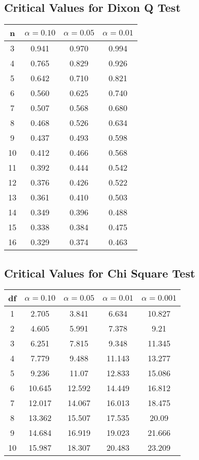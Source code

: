 \documentclass[a4paper,12pt]{article}
\begin{document}
\subsection*{Critical Values for Dixon Q Test}
{
	\Large
	\begin{center}
		\begin{tabular}{|c|c|c|c|}
			\hline  n  & $\alpha=0.10$  & $\alpha=0.05$  & $\alpha=0.01$  \\ \hline
			3  & 0.941 & 0.970  & 0.994 \\ \hline
			4  & 0.765 & 0.829 & 0.926 \\ \hline
			5  & 0.642 & 0.710  & 0.821 \\ \hline
			6  & 0.560  & 0.625 & 0.740  \\ \hline
			7  & 0.507 & 0.568 & 0.680  \\ \hline
			8  & 0.468 & 0.526 & 0.634 \\ \hline
			9  & 0.437 & 0.493 & 0.598 \\ \hline
			10 & 0.412 & 0.466 & 0.568 \\ \hline
			11 & 0.392 & 0.444 & 0.542 \\ \hline
			12 & 0.376 & 0.426 & 0.522 \\ \hline
			13 & 0.361 & 0.410  & 0.503 \\ \hline
			14 & 0.349 & 0.396 & 0.488 \\ \hline
			15 & 0.338 & 0.384 & 0.475 \\ \hline
			16 & 0.329 & 0.374 & 0.463 \\ \hline
		\end{tabular} 
	\end{center}
}
\subsection*{Critical Values for Chi Square Test}
{
	\Large
	\begin{center}
		\begin{tabular}{|c|c|c|c|c|}
			\hline 
			df	&	$\alpha=0.10$	&	$\alpha=0.05$	&	$\alpha=0.01$	&	$\alpha=0.001$	\\ \hline
			1	& 	2.705	&	3.841	&	6.634	&	10.827	\\ \hline
			2	&	4.605	&	5.991	&	7.378	&	9.21	\\ \hline
			3	&	6.251	&	7.815	&	9.348	&	11.345	\\ \hline
			4	&	7.779	&	9.488	&	11.143	&	13.277	\\ \hline
			5	&	9.236	&	11.07	&	12.833	&	15.086	\\ \hline
			6	&	10.645	&	12.592	&	14.449	&	16.812	\\ \hline
			7	&	12.017	&	14.067	&	16.013	&	18.475	\\ \hline
			8	&	13.362	&	15.507	&	17.535	&	20.09	\\ \hline
			9	&	14.684	&	16.919	&	19.023	&	21.666	\\ \hline
			10	&	15.987	&	18.307	&	20.483	&	23.209	\\ \hline
		\end{tabular} 
	\end{center}
}
\end{document}
